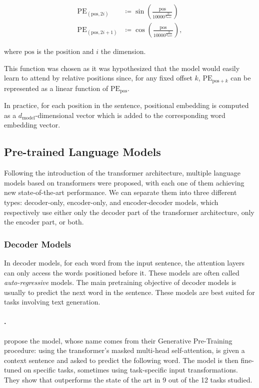 \begin{align*}
\mathrm{PE}_{(\mathrm{pos}, 2i)} & \coloneqq \sin \left( \frac{\mathrm{pos}}{10000^{\frac{2i}{d_\mathrm{model}}}} \right) \\
\mathrm{PE}_{(\mathrm{pos}, 2i+1)} & \coloneqq \cos \left( \frac{\mathrm{pos}}{10000^{\frac{2i}{d_\mathrm{model}}}} \right) ,
\end{align*}

where $\mathrm{pos}$ is the position and $i$ the dimension.

This function was chosen as it was hypothesized that the model would easily learn to attend by relative positions since, for any fixed offset $k$, $\mathrm{PE}_{\mathrm{pos}+k}$ can be represented as a linear function of $\mathrm{PE}_{\mathrm{pos}}$.

In practice, for each position in the sentence, positional embedding is computed as a $d_\textrm{model}$-dimensional vector which is added to the corresponding word embedding vector.

\subsection{Pre-trained Language Models} 
\label{sub:pretrained_language_models}

Following the introduction of the transformer architecture, multiple language models based on transformers were proposed, with each one of them achieving new state-of-the-art performance. We can separate them into three different types: decoder-only, encoder-only, and encoder-decoder models, which respectively use either only the decoder part of the transformer architecture, only the encoder part, or both.

\subsubsection{Decoder Models}

In decoder models, for each word from the input sentence, the attention layers can only access the words positioned before it. These models are often called \emph{auto-regressive} models. The main pretraining objective of decoder models is usually to predict the next word in the sentence. These models are best suited for tasks involving text generation.

\paragraph{\gpt.}
\citet{radford2018improving} propose the {\gpt} model, whose name comes from their Generative Pre-Training procedure: using the transformer's masked multi-head self-attention, {\gpt} is given a context sentence and asked to predict the following word. The model is then fine-tuned on specific tasks, sometimes using task-specific input transformations. They show that {\gpt} outperforms the state of the art in 9 out of the 12 tasks studied.

